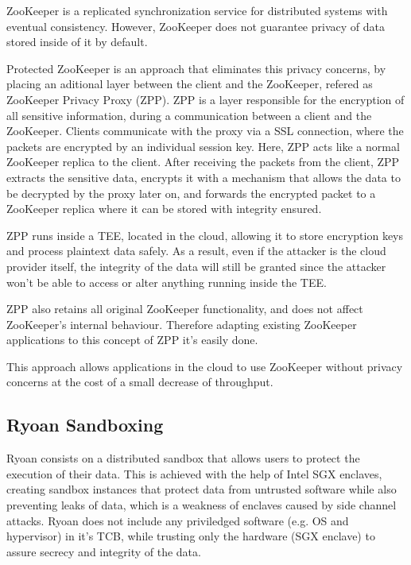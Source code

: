 ZooKeeper \cite{zookeeper} is a replicated synchronization service for distributed systems with eventual consistency. However, ZooKeeper does not guarantee privacy of data stored inside of it by default.
 
Protected ZooKeeper \cite{protectedZooKeeper} is an approach that eliminates this privacy concerns, by placing an aditional layer between the client and the ZooKeeper, refered as ZooKeeper Privacy Proxy (ZPP). ZPP is a layer responsible for the encryption of all sensitive information, during a communication between a client and the ZooKeeper. 
Clients communicate with the proxy via a SSL connection, where the packets are encrypted by an individual session key. Here, ZPP acts like a normal ZooKeeper replica to the client. 
After receiving the packets from the client, ZPP extracts the sensitive data, encrypts it with a mechanism that allows the data to be decrypted by the proxy later on, and forwards the encrypted packet to a ZooKeeper replica where it can be stored with integrity ensured.
 
ZPP runs inside a TEE, located in the cloud, allowing it to store encryption keys and process plaintext data safely. As a result, even if the attacker is the cloud provider itself, the integrity of the data will still be granted since the attacker won't be able to access or alter anything running inside the TEE.

ZPP also retains all original ZooKeeper functionality, and does not affect ZooKeeper's internal behaviour. Therefore adapting existing ZooKeeper applications to this concept of ZPP it's easily done.

This approach allows applications in the cloud to use ZooKeeper without privacy concerns at the cost of a small decrease of throughput.

\subsection{Ryoan Sandboxing}

Ryoan \cite{ryoanPaper} consists on a distributed sandbox that allows users to protect the execution of their data. This is achieved with the help of Intel SGX \cite{intelSGX} \cite{sgxPaper} enclaves, creating sandbox instances that protect data from untrusted software while also preventing leaks of data, which is a weakness of enclaves caused by side channel attacks.
Ryoan does not include any priviledged software (e.g. OS and hypervisor) in it's TCB, while trusting only the hardware (SGX enclave) to assure secrecy and integrity of the data.

